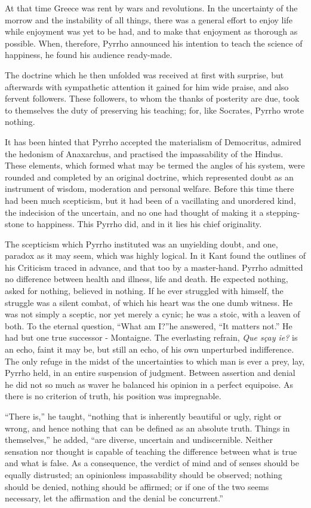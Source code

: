 \documentclass[]{book}
\begin{document}
At that time Greece was rent by wars and revolutions. In the uncertainty
of the morrow and the instability of all things, there was a general
effort to enjoy life while enjoyment was yet to be had, and to make that
enjoyment as thorough as possible. When, therefore, Pyrrho announced his
intention to teach the science of happiness, he found his audience
ready-made.

The doctrine which he then unfolded was received at first with surprise,
but afterwards with sympathetic attention it gained for him wide praise,
and also fervent followers. These followers, to whom the thanks of
posterity are due, took to themselves the duty of preserving his
teaching; for, like Socrates, Pyrrho wrote nothing.

It has been hinted that Pyrrho accepted the materialism of Democritus,
admired the hedonism of Anaxarchus, and practised the impassability of
the Hindus. These elements, which formed what may be termed the angles
of his system, were rounded and completed by an original doctrine, which
represented doubt as an instrument of wisdom, moderation and personal
welfare. Before this time there had been much scepticism, but it had
been of a vacillating and unordered kind, the indecision of the
uncertain, and no one had thought of making it a stepping-stone to
happiness. This Pyrrho did, and in it lies his chief originality.

The scepticism which Pyrrho instituted was an unyielding doubt, and one,
paradox as it may seem, which was highly logical. In it Kant found the
outlines of his Criticism traced in advance, and that too by a
master-hand. Pyrrho admitted no difference between health and illness,
life and death. He expected nothing, asked for nothing, believed in
nothing. If he ever struggled with himself, the struggle was a silent
combat, of which his heart was the one dumb witness. He was not simply a
sceptic, nor yet merely a cynic; he was a stoic, with a leaven of both.
To the eternal question, ``What am I?''he answered, ``It matters not.''
He had but one true successor - Montaigne. The everlasting refrain,
\emph{Que sçay ie?} is an echo, faint it may be, but still an echo, of
his own unperturbed indifference. The only refuge in the midst of the
uncertainties to which man is ever a prey, lay, Pyrrho held, in an
entire suspension of judgment. Between assertion and denial he did not
so much as waver he balanced his opinion in a perfect equipoise. As
there is no criterion of truth, his position was impregnable.

``There is,'' he taught, ``nothing that is inherently beautiful or ugly,
right or wrong, and hence nothing that can be defined as an absolute
truth. Things in themselves,'' he added, ``are diverse, uncertain and
undiscernible. Neither sensation nor thought is capable of teaching the
difference between what is true and what is false. As a consequence, the
verdict of mind and of senses should be equally distrusted; an
opinionless impassability should be observed; nothing should be denied,
nothing should be affirmed; or if one of the two seems necessary, let
the affirmation and the denial be concurrent.''
\end{document}
